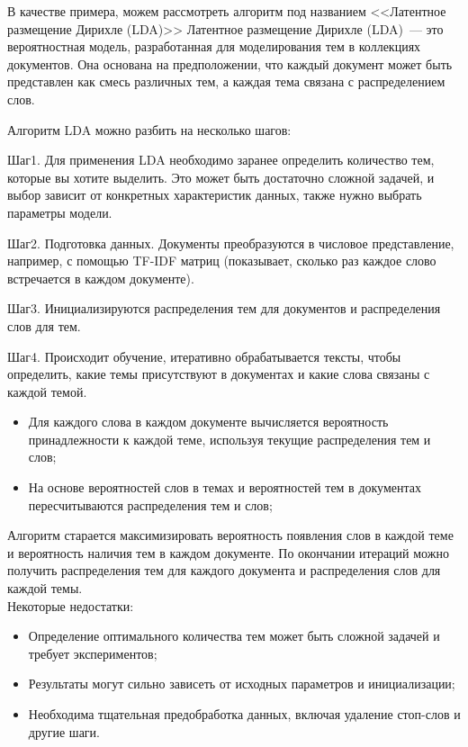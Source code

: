 \documentclass[bachelor, och, referat]{shiza}
\begin{document}
В качестве примера, можем рассмотреть алгоритм под названием <<Латентное размещение Дирихле (LDA)>>
Латентное размещение Дирихле (LDA)~--- это вероятностная модель, разработанная для моделирования тем в коллекциях документов. 
Она основана на предположении, что каждый документ может быть представлен как смесь различных тем, а каждая тема связана с распределением слов.

Алгоритм LDA можно разбить на несколько шагов:

Шаг1. Для применения LDA необходимо заранее определить количество тем, которые
вы хотите выделить. Это может быть достаточно сложной задачей, и выбор зависит 
от конкретных характеристик данных, также нужно выбрать параметры модели.

Шаг2. Подготовка данных. Документы преобразуются в числовое представление, например, с помощью TF-IDF матриц (показывает, сколько раз каждое слово встречается в каждом документе).

Шаг3. Инициализируются распределения тем для документов и распределения слов для тем.

Шаг4. Происходит обучение, итеративно обрабатывается тексты, чтобы определить, какие темы присутствуют 
в документах и какие слова связаны с каждой темой. 
\begin{itemize}
  \item Для каждого слова в каждом документе вычисляется вероятность принадлежности к каждой теме, используя текущие распределения тем и слов;
  \item На основе вероятностей слов в темах и вероятностей тем в документах пересчитываются распределения тем и слов;
\end{itemize}

Алгоритм старается максимизировать вероятность появления слов в каждой теме и вероятность наличия тем в каждом документе.
По окончании итераций можно получить распределения тем для каждого документа и распределения слов для каждой темы.\\
Некоторые недостатки:
\begin{itemize}
  \item Определение оптимального количества тем может быть сложной задачей и требует экспериментов;
  \item Результаты могут сильно зависеть от исходных параметров и инициализации;
  \item Необходима тщательная предобработка данных, включая удаление стоп-слов и другие шаги.
\end{itemize}
\end{document}
